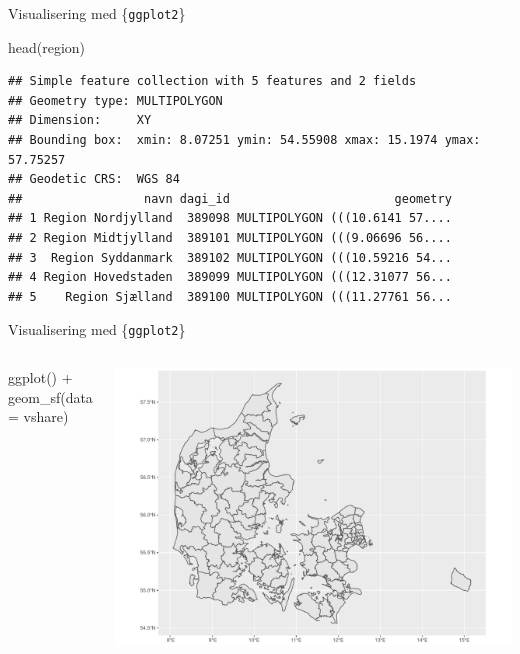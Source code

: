 \documentclass[
  8pt,
  ignorenonframetext,
  aspectratio=169]{beamer}
\newenvironment{Shaded}{}{}
\newcommand{\AttributeTok}[1]{\textcolor[rgb]{0.49,0.56,0.16}{#1}}
\newcommand{\FunctionTok}[1]{\textcolor[rgb]{0.02,0.16,0.49}{#1}}
\newcommand{\NormalTok}[1]{#1}
\newcommand{\SpecialCharTok}[1]{\textcolor[rgb]{0.25,0.44,0.63}{#1}}
\newcommand{\columnsbegin}{\begin{columns}}
\newcommand{\columnsend}{\end{columns}}
\begin{document}
\begin{frame}[fragile]{Visualisering med \{\texttt{ggplot2}\}}
\normalsize

\tiny

\begin{Shaded}
\begin{Highlighting}[]
\FunctionTok{head}\NormalTok{(region)}
\end{Highlighting}
\end{Shaded}

\begin{verbatim}
## Simple feature collection with 5 features and 2 fields
## Geometry type: MULTIPOLYGON
## Dimension:     XY
## Bounding box:  xmin: 8.07251 ymin: 54.55908 xmax: 15.1974 ymax: 57.75257
## Geodetic CRS:  WGS 84
##                 navn dagi_id                       geometry
## 1 Region Nordjylland  389098 MULTIPOLYGON (((10.6141 57....
## 2 Region Midtjylland  389101 MULTIPOLYGON (((9.06696 56....
## 3  Region Syddanmark  389102 MULTIPOLYGON (((10.59216 54...
## 4 Region Hovedstaden  389099 MULTIPOLYGON (((12.31077 56...
## 5    Region Sjælland  389100 MULTIPOLYGON (((11.27761 56...
\end{verbatim}

\normalsize
\end{frame}

\begin{frame}[fragile]{Visualisering med \{\texttt{ggplot2}\}}
\protect\hypertarget{visualisering-med-ggplot2-1}{}
\columnsbegin
{}

\tiny

\begin{Shaded}
\begin{Highlighting}[]
\FunctionTok{ggplot}\NormalTok{() }\SpecialCharTok{+}
  \FunctionTok{geom\_sf}\NormalTok{(}\AttributeTok{data =}\NormalTok{ vshare)}
\end{Highlighting}
\end{Shaded}

\normalsize {}

\tiny

\includegraphics{crashcourse_slides_files/figure-beamer/unnamed-chunk-18-1.pdf}

\normalsize \columnsend
\end{frame}
\end{document}
